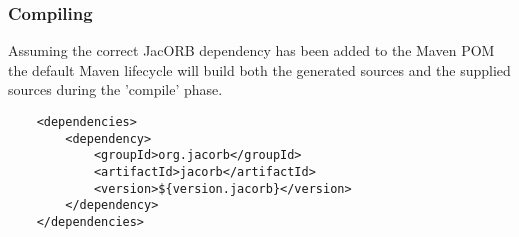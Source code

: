 \subsubsection{Compiling}
Assuming the correct JacORB dependency has been added to the Maven POM the default Maven lifecycle will build both
the generated sources and the supplied sources during the 'compile' phase.
\begin{verbatim}
    <dependencies>
        <dependency>
            <groupId>org.jacorb</groupId>
            <artifactId>jacorb</artifactId>
            <version>${version.jacorb}</version>
        </dependency>
    </dependencies>
\end{verbatim}


